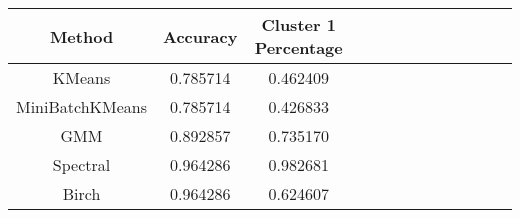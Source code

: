 \begin{tabular}{ccccccccccccc}
\toprule
         Method &  Accuracy &  Cluster 1 Percentage \\
\midrule
         KMeans &  0.785714 &              0.462409 \\
MiniBatchKMeans &  0.785714 &              0.426833 \\
            GMM &  0.892857 &              0.735170 \\
       Spectral &  0.964286 &              0.982681 \\
          Birch &  0.964286 &              0.624607 \\
\bottomrule
\end{tabular}
